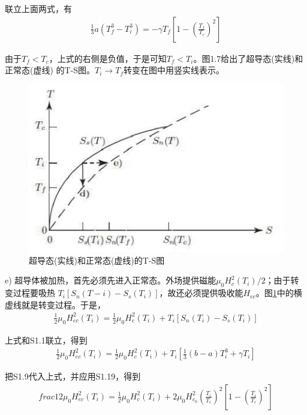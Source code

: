 联立上面两式，有
\begin{align*}
\frac{1}{3}a(T_f^3-T_i^3)=-\gamma T_f\left[ 1-\left(\frac{T_f}{T_c}\right)^2\right]\tag{S1.20}
\end{align*}

由于$T_f<T_c$，上式的右侧是负值，于是可知$T_f<T_i$。图1.7给出了超导态(实线)和正常态(虚线)
的T-S图。$T_i\rightarrow T_f$转变在图中用竖实线表示。

\begin{figure}
  \centering
 \includegraphics[scale=0.7]{chpt1/figs/fig1.7.eps}
  \caption{超导态(实线)和正常态(虚线)的T-S图}\label{fig:tsplot}
\end{figure}

e) 超导体被加热，首先必须先进入正常态。外场提供磁能$\mu_0 H_c^2(T_i)/2$；由于转变过程要吸热
$T_i[S_n(T-i)-S_s(T_i)]$，故还必须提供吸收能$H_{ec}$。图\ref{fig:tsplot}中的横虚线就是转变过程。于是，
\begin{align*}
\frac{1}{2}\mu_0 H_{ec}^2(T_i)=\frac{1}{2}\mu_0 H_c^2(T_i)+T_i[S_n(T_i)-S_s(T_i)]\tag{S1.21}
\end{align*}

上式和S1.1联立，得到
\begin{align*}
\frac{1}{2}\mu_0 H_{ec}^2(T_i)=\frac{1}{2}\mu_0 H_c^2(T_i)+T_i\left[\frac{1}{3}(b-a)T_i^3+\gamma T_i\right] \tag{S1.22}
\end{align*}

把S1.9代入上式，并应用S1.19，得到
\begin{align*}
frac{1}{2}\mu_0 H_{ec}^2(T_i)=\frac{1}{2}\mu_0 H_c^2(T_i)+2\mu_0 H_{c_0}^2\left(\frac{T_i}{T_c}\right)^2 \left[1-\left(\frac{T_i}{T_c}\right)^2 \right] \tag{S1.23}
\end{align*}

